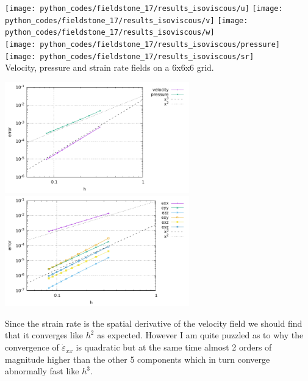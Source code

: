 \begin{center}
\texttt{[image: python\_codes/fieldstone\_17/results\_isoviscous/u]}
\texttt{[image: python\_codes/fieldstone\_17/results\_isoviscous/v]}
\texttt{[image: python\_codes/fieldstone\_17/results\_isoviscous/w]}\\
\texttt{[image: python\_codes/fieldstone\_17/results\_isoviscous/pressure]}
\texttt{[image: python\_codes/fieldstone\_17/results\_isoviscous/sr]}\\
{\captionfont Velocity, pressure and strain rate fields on a 6x6x6 grid.}
\end{center}

\begin{center}
\includegraphics[width=8cm]{python_codes/fieldstone_17/results_isoviscous/errors.pdf}
\includegraphics[width=8cm]{python_codes/fieldstone_17/results_isoviscous/errors_sr.pdf}
\end{center}
Since the strain rate is the spatial derivative of the velocity field we should 
find that it converges like $h^2$ as expected. However I am quite puzzled as to why the convergence 
of $\dot{\varepsilon}_{xx}$ is quadratic 
but at the same time almost 2 orders of magnitude higher than the other 5 components which in turn 
converge abnormally fast like $h^3$.

